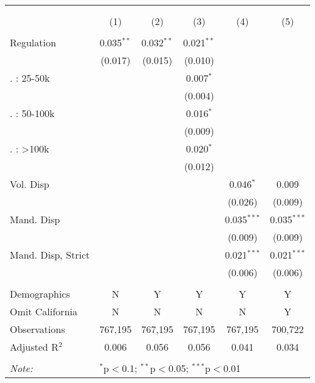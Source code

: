 
\begin{table}[!htbp] \centering 
  \caption{} 
  \label{} 
\begin{tabular}{@{\extracolsep{5pt}}lccccc} 
\\[-1.8ex]\hline 
\hline \\[-1.8ex] 
\\[-1.8ex] & (1) & (2) & (3) & (4) & (5)\\ 
\hline \\[-1.8ex] 
 Regulation & 0.035$^{**}$ & 0.032$^{**}$ & 0.021$^{**}$ &  &  \\ 
  & (0.017) & (0.015) & (0.010) &  &  \\ 
   . : 25-50k &  &  & 0.007$^{*}$ &  &  \\ 
  &  &  & (0.004) &  &  \\ 
   . : 50-100k &  &  & 0.016$^{*}$ &  &  \\ 
  &  &  & (0.009) &  &  \\ 
   . : >100k &  &  & 0.020$^{*}$ &  &  \\ 
  &  &  & (0.012) &  &  \\ 
  Vol. Disp &  &  &  & 0.046$^{*}$ & 0.009 \\ 
  &  &  &  & (0.026) & (0.009) \\ 
  Mand. Disp &  &  &  & 0.035$^{***}$ & 0.035$^{***}$ \\ 
  &  &  &  & (0.009) & (0.009) \\ 
  Mand. Disp, Strict &  &  &  & 0.021$^{***}$ & 0.021$^{***}$ \\ 
  &  &  &  & (0.006) & (0.006) \\ 
 \hline \\[-1.8ex] 
Demographics & N & Y & Y & Y & Y \\ 
Omit California & N & N & N & N & Y \\ 
Observations & 767,195 & 767,195 & 767,195 & 767,195 & 700,722 \\ 
Adjusted R$^{2}$ & 0.006 & 0.056 & 0.056 & 0.041 & 0.034 \\ 
\hline 
\hline \\[-1.8ex] 
\textit{Note:}  & \multicolumn{5}{l}{$^{*}$p$<$0.1; $^{**}$p$<$0.05; $^{***}$p$<$0.01} \\ 
\end{tabular} 
\end{table} 
